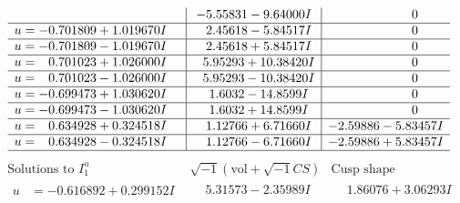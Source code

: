 \documentclass[1p]{elsarticle_modified}
\theoremstyle{definition}
\newcommand{\I}{\sqrt{-1}}
\begin{document}
$$\begin{array}{c|c|c}
 & -5.55831 - 9.64000 I & \phantom{-0.000000 } 0 \\ \hline\begin{aligned}
u &= -0.701809 + 1.019670 I\end{aligned}
 & \phantom{-}2.45618 - 5.84517 I & \phantom{-0.000000 } 0 \\ \hline\begin{aligned}
u &= -0.701809 - 1.019670 I\end{aligned}
 & \phantom{-}2.45618 + 5.84517 I & \phantom{-0.000000 } 0 \\ \hline\begin{aligned}
u &= \phantom{-}0.701023 + 1.026000 I\end{aligned}
 & \phantom{-}5.95293 + 10.38420 I & \phantom{-0.000000 } 0 \\ \hline\begin{aligned}
u &= \phantom{-}0.701023 - 1.026000 I\end{aligned}
 & \phantom{-}5.95293 - 10.38420 I & \phantom{-0.000000 } 0 \\ \hline\begin{aligned}
u &= -0.699473 + 1.030620 I\end{aligned}
 & \phantom{-}1.6032 - 14.8599 I & \phantom{-0.000000 } 0 \\ \hline\begin{aligned}
u &= -0.699473 - 1.030620 I\end{aligned}
 & \phantom{-}1.6032 + 14.8599 I & \phantom{-0.000000 } 0 \\ \hline\begin{aligned}
u &= \phantom{-}0.634928 + 0.324518 I\end{aligned}
 & \phantom{-}1.12766 + 6.71660 I & -2.59886 - 5.83457 I \\ \hline\begin{aligned}
u &= \phantom{-}0.634928 - 0.324518 I\end{aligned}
 & \phantom{-}1.12766 - 6.71660 I & -2.59886 + 5.83457 I\\
 \hline 
 \end{array}$$\newpage$$\begin{array}{c|c|c}  
\text{Solutions to }I^u_{1}& \I (\text{vol} + \sqrt{-1}CS) & \text{Cusp shape}\\
 \hline 
\begin{aligned}
u &= -0.616892 + 0.299152 I\end{aligned}
 & \phantom{-}5.31573 - 2.35989 I & \phantom{-}1.86076 + 3.06293 I \\ \hline\begin{aligned}

\end{aligned}
\end{array}$$
\end{document}
